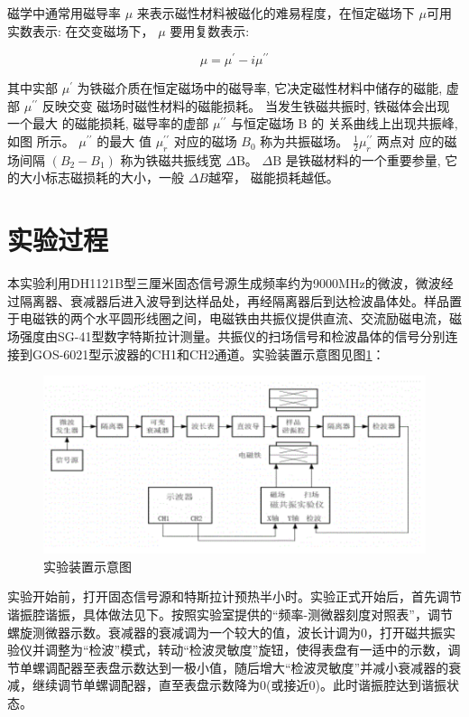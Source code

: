 \documentclass{buaaemp}
\begin{document}
磁学中通常用磁导率 $ \mu $ 来表示磁性材料被磁化的难易程度，在恒定磁场下 $\mu$可用实数表示: 在交变磁场下， $ \mu$  要用复数表示:

\begin{equation}
    \mu=\mu^{\prime}-i \mu^{\prime \prime}
\end{equation}

其中实部  $\mu^{\prime}$  为铁磁介质在恒定磁场中的磁导率,
它决定磁性材料中储存的磁能, 虚部  $\mu^{\prime \prime} $ 反映交变 磁场时磁性材料的磁能损耗。
当发生铁磁共振时, 铁磁体会出现一个最大 的磁能损耗, 磁导率的虚部  $\mu^{\prime \prime}$  与恒定磁场 $ \mathrm{B} $ 的 关系曲线上出现共振峰, 如图 所示。 $ \mu^{\prime \prime}$  的最大 值  $\mu_{r}^{\prime \prime} $ 对应的磁场  $B_{0}$  称为共振磁场。  $\frac{1}{2} \mu_{r}^{\prime \prime}$  两点对 应的磁场间隔 $ \left(B_{2}-B_{1}\right)$  称为铁磁共振线宽 $ \Delta \mathrm{B} $。 $\Delta \mathrm{B} $ 是铁磁材料的一个重要参量, 它的大小标志磁损耗的大小，一般 $\Delta B$越窄， 磁能损耗越低。
	
 \section{实验过程}
	\label{section:procedure}
	本实验利用DH1121B型三厘米固态信号源生成频率约为9000MHz的微波，微波经过隔离器、衰减器后进入波导到达样品处，再经隔离器后到达检波晶体处。样品置于电磁铁的两个水平圆形线圈之间，电磁铁由共振仪提供直流、交流励磁电流，磁场强度由SG-41型数字特斯拉计测量。共振仪的扫场信号和检波晶体的信号分别连接到GOS-6021型示波器的CH1和CH2通道。实验装置示意图见图\ref{figure:apparatus}：
	\begin{figure}[htbp]
		\centering
		\includegraphics[width=\linewidth]{image/apparatus.png}
		\caption{实验装置示意图\cite{钱建强2016近代物理实验}}
		\label{figure:apparatus}
	\end{figure}
	
	实验开始前，打开固态信号源和特斯拉计预热半小时。实验正式开始后，首先调节谐振腔谐振，具体做法见下。按照实验室提供的“频率-测微器刻度对照表”，调节螺旋测微器示数。衰减器的衰减调为一个较大的值，波长计调为0，打开磁共振实验仪并调整为“检波”模式，转动“检波灵敏度”旋钮，使得表盘有一适中的示数，调节单螺调配器至表盘示数达到一极小值，随后增大“检波灵敏度”并减小衰减器的衰减，继续调节单螺调配器，直至表盘示数降为0(或接近0)。此时谐振腔达到谐振状态。
	
\end{document}
